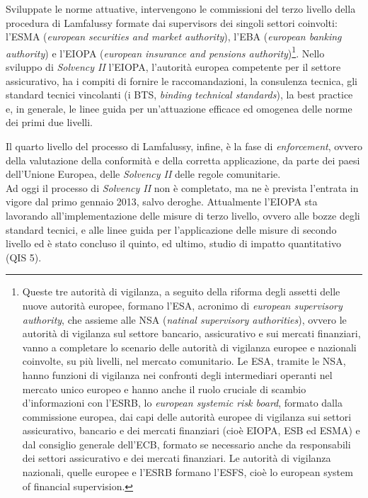 Sviluppate le norme attuative, intervengono le commissioni del terzo livello della procedura di Lamfalussy formate dai supervisors dei singoli settori coinvolti: l’ESMA ({\itshape european securities and market authority}), l’EBA ({\itshape european banking authority}) e l’EIOPA ({\itshape european insurance and pensions authority})\footnote{Queste tre autorità di vigilanza, a seguito della riforma degli assetti delle nuove autorità europee, formano l’ESA, acronimo di {\itshape european supervisory authority}, che assieme alle NSA ({\itshape natinal supervisory authorities}), ovvero le autorità di vigilanza sul settore bancario, assicurativo e sui mercati finanziari, vanno a completare lo scenario delle autorità di vigilanza europee e nazionali coinvolte, su più livelli, nel mercato comunitario. Le ESA, tramite le NSA, hanno funzioni di vigilanza nei confronti degli intermediari operanti nel mercato unico europeo e hanno anche il ruolo cruciale di scambio d’informazioni con l’ESRB, lo {\itshape european systemic risk board}, formato dalla commissione europea, dai capi delle autorità europee di vigilanza sui settori assicurativo, bancario e dei mercati finanziari (cioè EIOPA, ESB ed ESMA) e dal consiglio generale dell’ECB, formato se necessario anche da responsabili dei settori assicurativo e dei mercati finanziari. Le autorità di vigilanza nazionali, quelle europee e l’ESRB formano l’ESFS, cioè lo european system of financial supervision.}. 
Nello sviluppo di \textit{\textit{Solvency I}I} l’EIOPA, l’autorità europea competente per il settore assicurativo, ha i compiti di fornire le raccomandazioni, la consulenza tecnica, gli standard tecnici vincolanti (i BTS, {\itshape binding technical standards}), la best practice e, in generale, le linee guida per un’attuazione efficace ed omogenea delle norme dei primi due livelli.

Il quarto livello del processo di Lamfalussy, infine, è la fase di {\itshape enforcement}, ovvero della valutazione della conformità e della corretta applicazione, da parte dei paesi dell’Unione Europea, delle  \textit{\textit{Solvency I}I} delle regole comunitarie. \\
Ad oggi il processo di \textit{\textit{Solvency I}I} non è completato, ma ne è prevista l’entrata in vigore dal primo gennaio 2013, salvo deroghe. Attualmente l’EIOPA sta lavorando all’implementazione delle misure di terzo livello, ovvero alle bozze degli standard tecnici, e alle linee guida per l’applicazione delle misure di secondo livello ed è stato concluso il quinto, ed ultimo, studio di impatto quantitativo (QIS 5).

